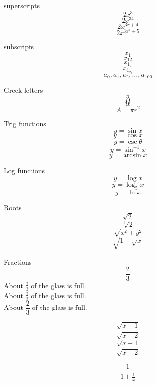\documentclass[11pt]{article}
\begin{document}
superscripts $$2x^3$$
$$2x^{34}$$
$$2x^{3x+4}$$
$$2x^{3x^4+5}$$

subscripts
$$x_1$$
$$x_{12}$$
$$x_{1_2}$$
$$x_{1_{2_3}}$$
$$a_0, a_1, a_2, \ldots, a_{100}$$

Greek letters
$$\pi$$
$$\Pi$$
$$\alpha$$
$$A=\pi r^2$$

Trig functions
$$y=\sin x$$
$$y=\cos x$$
$$y=\csc \theta$$
$$y=\sin ^{-1} x$$
$$y=\arcsin x$$

Log functions
$$y=\log x$$
$$y=\log_5 x$$
$$y=\ln x$$

Roots
$$\sqrt{2}$$
$$\sqrt[3]{2}$$
$$\sqrt{x^2+y^2}$$
$$\sqrt{1+\sqrt{x}}$$

Fractions
$$\frac{2}{3}$$
About $\displaystyle \frac{2}{3}$ of the glass is full.\\[16pt]
About $\frac{2}{3}$ of the glass is full.\\[6pt]
About $\dfrac{2}{3}$ of the glass is full.

$$\frac{\sqrt{x+1}}{\sqrt{x+2}}$$
$$\frac{\sqrt{x+1}}{\sqrt{x+2}}$$

$$\frac{1}{     1+\frac{1}{x}      }$$
\end{document}
